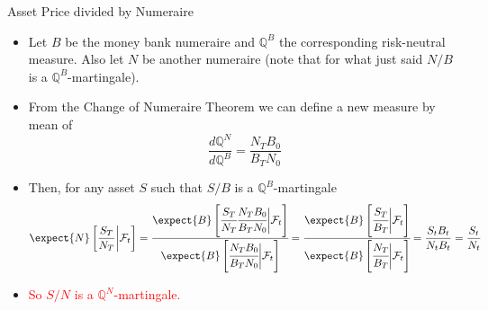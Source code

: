 \documentclass{beamer}
\begin{document}
\begin{frame}{Asset Price divided by Numeraire}
	\begin{itemize}
 	\item<1-> Let $B$ be the money bank numeraire and $\mathbb{Q}^B$ the corresponding risk-neutral measure. Also let $N$ be another numeraire (note that for what just said $N/B$ is a $\mathbb{Q}^B$-martingale). 
	\item<2-> From the Change of Numeraire Theorem we can define a new measure by mean of
  \begin{equation*}
    \frac{d\mathbb{Q}^N}{d\mathbb{Q}^B} = \frac{N_TB_0}{B_TN_0}
  \end{equation*}
	\item<3-> Then, for any asset $S$ such that $S/B$ is a $\mathbb{Q}^B$-martingale
  \begin{equation*}
    \expect{N}\left[\frac{S_T}{N_T}\bigg|\mathcal{F}_t\right] = \cfrac{\expect{B}\left[\cfrac{S_T}{N_T}\cfrac{N_TB_0}{B_TN_0}\bigg|\mathcal{F}_t\right]}{\expect{B}\left[\cfrac{N_TB_0}{B_TN_0}\bigg|\mathcal{F}_t\right]}
    =\cfrac{\expect{B}\left[\cfrac{S_T}{B_T}\bigg|\mathcal{F}_t\right]}
    {\expect{B}\left[\cfrac{N_T}{B_T}\bigg|\mathcal{F}_t\right]}
    =\frac{S_tB_t}{N_tB_t}=\frac{S_t}{N_t}
  \end{equation*}
\myendproof
	\item<4-> \textcolor{red}{So $S/N$ is a $\mathbb{Q}^N$-martingale.}
	\end{itemize}
\end{frame}
\end{document}
